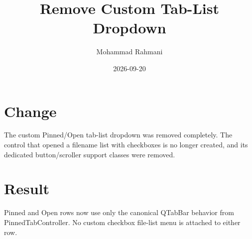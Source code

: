 \documentclass[a4paper]{article}
\title{Remove Custom Tab-List Dropdown}
\date{2026-09-20}
\author{Mohammad Rahmani}
\begin{document}
   \maketitle

   \begin{preview}
      \section{Change}
      The custom Pinned/Open tab-list dropdown was removed completely.  The
      control that opened a filename list with checkboxes is no longer created,
      and its dedicated button/scroller support classes were removed.

      \section{Result}
      Pinned and Open rows now use only the canonical QTabBar behavior from
      PinnedTabController.  No custom checkbox file-list menu is attached to
      either row.
   \end{preview}

   
   
\end{document}
